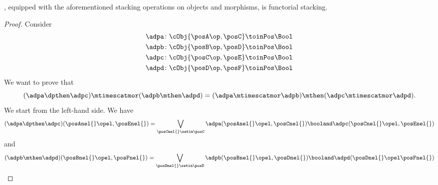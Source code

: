 \begin{lemma}
    \DPL, equipped with the aforementioned stacking operations on objects and morphisms, is functorial stacking.
\end{lemma}

\begin{proof}
    Consider
    \begin{equation}
        \begin{aligned}
            \adpa\colon \cObj{\posA\op, \posC} & \toinPos \Bool \\
            \adpb\colon \cObj{\posB\op, \posD} & \toinPos \Bool \\
            \adpc\colon \cObj{\posC\op, \posE} & \toinPos \Bool \\
            \adpd\colon \cObj{\posD\op, \posF} & \toinPos \Bool
        \end{aligned}
    \end{equation}
    We want to prove that
    \begin{equation}
        (\adpa \dpthen \adpc)
        \mtimescatmor (\adpb \mthen \adpd)=(\adpa \mtimescatmor \adpb) \mthen (\adpc \mtimescatmor \adpd).
    \end{equation}
    We start from the left-hand side.
    We have
    \begin{equation}
        (\adpa \dpthen \adpc)(\posAnel{}\opel,\posEnel{})
        =\bigvee_{\posCnel{}\setin \posC}
        \adpa(\posAnel{}\opel, \posCnel{}) \booland \adpc(\posCnel{}\opel,\posEnel{})
    \end{equation}
    and
    \begin{equation}
        \begin{aligned}
            (\adpb \mthen \adpd)(\posBnel{}\opel,\posFnel{})
            =\bigvee_{\posDnel{}\setin \posD}
            \adpb(\posBnel{}\opel, \posDnel{}) \booland \adpd(\posDnel{}\opel\posFnel{})
        \end{aligned}

\end{equation}
\end{proof}
